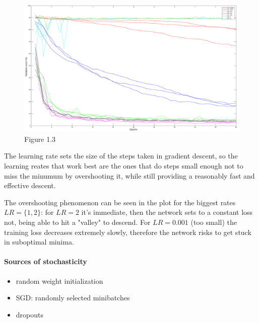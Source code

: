 \documentclass{article}
\begin{document}
    \begin{figure}[!htb]
        \centering
        \includegraphics[width=\textwidth]{figures/sc1_val_err}
        \captionsetup{labelformat=empty}
        \caption{Figure 1.3}
    \end{figure}
    
    The learning rate sets the size of the steps taken in gradient descent, so the learning reates that work best are the ones that do steps small enough not to miss the minumum by overshooting it,
    while still providing a reasonably fast and effective descent. 
    
    The overshooting phenomenon can be seen in the plot for the biggest rates $LR = \{1,2\}$: for $LR = 2$ it's immediate, then the network sets to a constant loss 
    not, being able to hit a "valley" to descend.
    For $LR = 0.001$ (too small) the training loss decreases extremely slowly, therefore the network risks to get stuck in suboptimal minima.
    
    \paragraph*{Sources of stochasticity}
        \begin{itemize}
        \item random weight initialization
        \item SGD: randomly selected minibatches
        \item dropouts
        \end{itemize}
    
    
    
    
\end{document}

